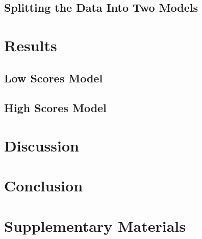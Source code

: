\documentclass[twocolumn]{article} %
\begin{document}
\subsection*{Splitting the Data Into Two Models}
\lipsum[1]

\section{Results}
\subsection*{Low Scores Model}
\lipsum[1]
\subsection*{High Scores Model}
\lipsum[1]

\section{Discussion}
\lipsum[1]

\section{Conclusion}
\lipsum[1]

    

\newpage
\onecolumn

\section*{Supplementary Materials}

\renewcommand{\figurename}{Supplementary Figure}
\setcounter{figure}{0}
\end{document}
